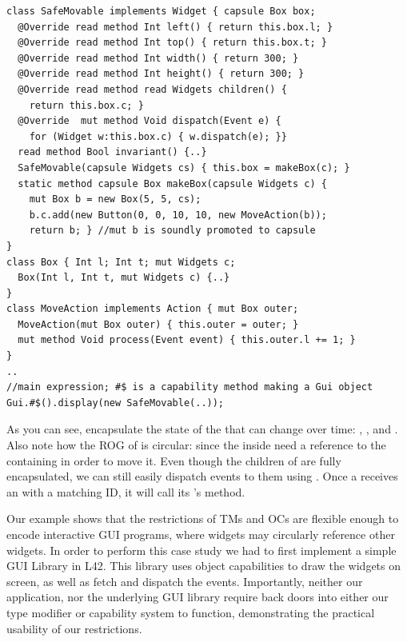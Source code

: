\begin{lstlisting}[mathescape=false]
class SafeMovable implements Widget { capsule Box box;
  @Override read method Int left() { return this.box.l; }
  @Override read method Int top() { return this.box.t; }
  @Override read method Int width() { return 300; }
  @Override read method Int height() { return 300; }
  @Override read method read Widgets children() {
    return this.box.c; }
  @Override  mut method Void dispatch(Event e) {
    for (Widget w:this.box.c) { w.dispatch(e); }}
  read method Bool invariant() {..}
  SafeMovable(capsule Widgets cs) { this.box = makeBox(c); }
  static method capsule Box makeBox(capsule Widgets c) {
    mut Box b = new Box(5, 5, cs);
    b.c.add(new Button(0, 0, 10, 10, new MoveAction(b));
    return b; } //mut b is soundly promoted to capsule
}
class Box { Int l; Int t; mut Widgets c;
  Box(Int l, Int t, mut Widgets c) {..}
}
class MoveAction implements Action { mut Box outer;
  MoveAction(mut Box outer) { this.outer = outer; }
  mut method Void process(Event event) { this.outer.l += 1; }
}
..
//main expression; #$ is a capability method making a Gui object
Gui.#$().display(new SafeMovable(..));
\end{lstlisting}\saveSpace
As you can see, \Q@Box@es encapsulate the state of the \Q@SafeMovable@s that can change over time:
\Q@left@, \Q@top@, and \Q@children@. Also note how the ROG of \Q@Box@ is circular: since
the \Q@MoveAction@s inside \Q@Button@s need a reference to the containing \Q@Box@ in order to move it.
Even though the children of \Q@SafeMovable@s are fully encapsulated, we can still easily dispatch events to them using \Q@dispatch@. Once a \Q@Button@ receives an \Q@Event@ with a matching ID, it will call its \Q@Action@'s \Q@process@ method. 

Our example shows that the restrictions of TMs and OCs are flexible enough to encode interactive GUI programs, where widgets may circularly reference other widgets.
In order to perform this case study we had to first implement a simple GUI Library in L42. This library uses object capabilities to draw the widgets on screen, as well as fetch and dispatch the events. Importantly, neither our application, nor the underlying GUI library require back doors into either our type modifier or capability system to function, demonstrating the practical usability of our restrictions.


